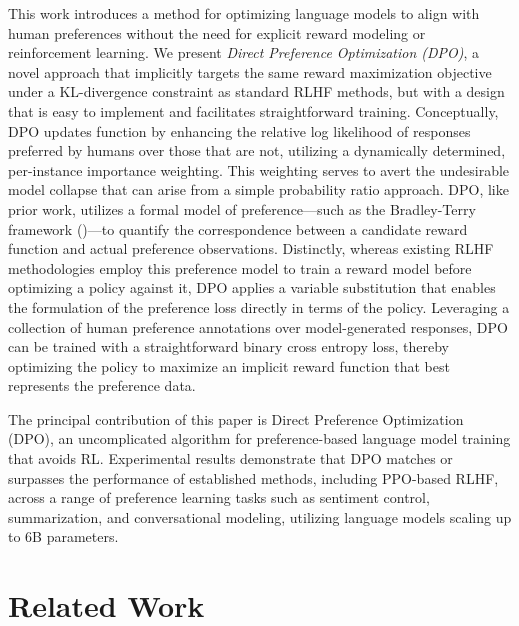 This work introduces a method for optimizing language models to align with human preferences without the need for explicit reward modeling or reinforcement learning. We present
\textit{{Direct Preference Optimization} (DPO)}, a novel approach that implicitly targets the same reward maximization objective under a KL-divergence constraint as standard RLHF methods, but with a design that is easy to implement and facilitates straightforward training. Conceptually, DPO updates function by enhancing the relative log likelihood of responses preferred by humans over those that are not, utilizing a dynamically determined, per-instance importance weighting. This weighting serves to avert the undesirable model collapse that can arise from a simple probability ratio approach. DPO, like prior work, utilizes a formal model of preference—such as the Bradley-Terry framework (\cite{bradley1952rankanalysis})—to quantify the correspondence between a candidate reward function and actual preference observations. Distinctly, whereas existing RLHF methodologies employ this preference model to train a reward model before optimizing a policy against it, DPO applies a variable substitution that enables the formulation of the preference loss directly in terms of the policy. Leveraging a collection of human preference annotations over model-generated responses, DPO can be trained with a straightforward binary cross entropy loss, thereby optimizing the policy to maximize an implicit reward function that best represents the preference data.

The principal contribution of this paper is Direct Preference Optimization (DPO), an uncomplicated algorithm for preference-based language model training that avoids RL. Experimental results demonstrate that DPO matches or surpasses the performance of established methods, including PPO-based RLHF, across a range of preference learning tasks such as sentiment control, summarization, and conversational modeling, utilizing language models scaling up to 6B parameters.

\section{Related Work}

